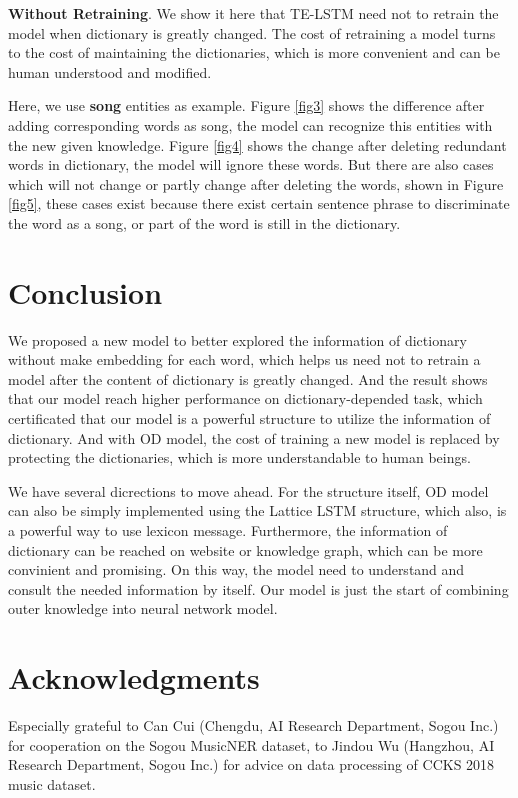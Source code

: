 \documentclass[letterpaper]{article} %
\begin{document}
\textbf{Without Retraining}. We show it here that TE-LSTM need not to retrain the model when dictionary is greatly changed. The cost of retraining a model turns to the cost of maintaining the dictionaries, which is more convenient and can be human understood and modified. 

Here, we use \textbf{song} entities as example. Figure \ref{fig3} shows the difference after adding corresponding words as song, the model can recognize this entities with the new given knowledge. Figure \ref {fig4} shows the change after deleting redundant words in dictionary, the model will ignore these words. But there are also cases which will not change or partly change after deleting the words, shown in Figure \ref{fig5},  these cases exist because there exist certain sentence phrase to discriminate the word as a song,  or part of the word is still in the dictionary.



\section{Conclusion}

We proposed a new model to better explored the information of dictionary without make embedding for each word, which helps us need not to retrain a model after the content of dictionary is greatly changed. And the result shows that our model reach higher performance on dictionary-depended task, which certificated that our model is a powerful structure to utilize the information of dictionary. And with OD model, the cost of training a new model is replaced by protecting the dictionaries, which is more understandable to human beings.

We have several dicrections to move ahead. For the structure itself, OD model can also be simply implemented using the Lattice LSTM structure, which also, is a powerful way to use lexicon message. Furthermore, the information of dictionary can be reached on website or knowledge graph, which can be more convinient and promising. On this way, the model need to understand and consult the needed information by itself. Our model is just the start of combining outer knowledge into neural network model. 

\section{ Acknowledgments }
Especially grateful to Can Cui (Chengdu, AI Research Department, Sogou Inc.) for cooperation on the Sogou MusicNER dataset, to Jindou Wu (Hangzhou, AI Research Department, Sogou Inc.) for advice on data processing of CCKS 2018 music dataset.
\end{document}
